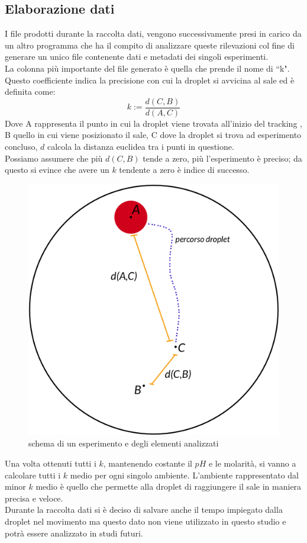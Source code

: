 \subsection{Elaborazione dati}
I file prodotti durante la raccolta dati, vengono successivamente presi in carico da un altro programma che ha il compito di analizzare queste rilevazioni col fine di generare un unico file contenente dati e metadati dei singoli esperimenti.
\\La colonna più importante del file generato è quella che prende il nome di ``k". Questo coefficiente indica la precisione con cui la droplet si avvicina al sale ed è definita come:
\begin{equation} 	
	k := \frac { d(C,B) }{ d(A,C) }
\end{equation}
Dove A rappresenta il punto in cui la droplet viene trovata all'inizio del tracking , B quello in cui viene posizionato il sale, C dove la droplet si trova ad esperimento concluso, $d$ calcola la distanza euclidea tra i punti in questione. 
\\Possiamo assumere che più $d(C,B)$ tende a zero, più l'esperimento è preciso; da questo si evince che avere un $k$ tendente a zero è indice di successo.   
\begin{figure}[h]
	  \includegraphics[scale=0.30]{immagini/schemaNew.png}
		\centering
	 \caption{schema di un esperimento e degli elementi analizzati}
\end{figure} 
Una volta ottenuti tutti i $k$, mantenendo costante il $pH$ e le molarità, si vanno a calcolare tutti i $k$ medio per ogni singolo ambiente. L'ambiente rappresentato dal minor $k$ medio è quello che permette alla droplet di raggiungere il sale in maniera precisa e veloce. 
\\Durante la raccolta dati si è deciso di salvare anche il tempo impiegato dalla droplet nel movimento ma questo dato non viene utilizzato in questo studio e potrà essere analizzato in studi futuri. 

